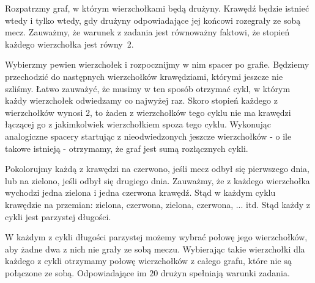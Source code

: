 \noindent
Rozpatrzmy graf, w którym wierzchołkami będą drużyny. Krawędź będzie istnieć wtedy i tylko wtedy, gdy drużyny odpowiadające jej końcowi rozegrały ze sobą mecz. Zauważmy, że warunek z zadania jest równoważny faktowi, że stopień każdego wierzchołka jest równy~2. 

Wybierzmy pewien wierzchołek i rozpocznijmy w nim spacer po grafie. Będziemy przechodzić do następnych wierzchołków krawędziami, którymi jeszcze nie szliśmy. Łatwo zauważyć, że musimy w ten sposób otrzymać cykl, w którym każdy wierzchołek odwiedzamy co najwyżej raz. Skoro stopień każdego z wierzchołków wynosi $2$, to żaden z wierzchołków tego cyklu nie ma krawędzi łączącej go z jakimkolwiek wierzchołkiem spoza tego cyklu. Wykonując analogiczne spacery startując z nieodwiedzonych jeszcze wierzchołków - o ile takowe istnieją - otrzymamy, że graf jest sumą rozłącznych cykli.

Pokolorujmy każdą z krawędzi na czerwono, jeśli mecz odbył się pierwszego dnia, lub na zielono, jeśli odbył się drugiego dnia. Zauważmy, że z każdego wierzchołka wychodzi jedna zielona i jedna czerwona krawędź. Stąd w każdym cyklu krawędzie na przemian: zielona, czerwona, zielona, czerwona, ... itd. Stąd każdy z cykli jest parzystej długości. 

\begin{center}
\end{center}

W każdym z cykli długości parzystej możemy wybrać połowę jego wierzchołków, aby żadne dwa z nich nie grały ze sobą meczu. Wybierając takie wierzchołki dla każdego z cykli otrzymamy połowę wierzchołków z całego grafu, które nie są połączone ze sobą. Odpowiadające im $20$ drużyn spełniają warunki zadania.

\vspace{5px}

